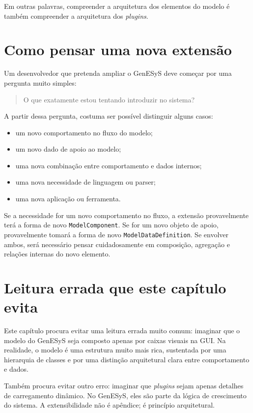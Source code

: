 Em outras palavras, compreender a arquitetura dos elementos do modelo é também compreender a arquitetura dos \textit{plugins}.

\section{Como pensar uma nova extensão}
\label{sec:cap8_como_pensar_nova_extensao}

Um desenvolvedor que pretenda ampliar o GenESyS deve começar por uma pergunta muito simples:
\begin{quote}
    O que exatamente estou tentando introduzir no sistema?
\end{quote}

A partir dessa pergunta, costuma ser possível distinguir alguns casos:

\begin{itemize}
    \item um novo comportamento no fluxo do modelo;
    \item um novo dado de apoio ao modelo;
    \item uma nova combinação entre comportamento e dados internos;
    \item uma nova necessidade de linguagem ou parser;
    \item uma nova aplicação ou ferramenta.
\end{itemize}

Se a necessidade for um novo comportamento no fluxo, a extensão provavelmente terá a forma de novo \texttt{ModelComponent}. Se for um novo objeto de apoio, provavelmente tomará a forma de novo \texttt{ModelDataDefinition}. Se envolver ambos, será necessário pensar cuidadosamente em composição, agregação e relações internas do novo elemento.

\section{Leitura errada que este capítulo evita}
\label{sec:cap8_leitura_errada_evita}

Este capítulo procura evitar uma leitura errada muito comum: imaginar que o modelo do GenESyS seja composto apenas por caixas visuais na GUI. Na realidade, o modelo é uma estrutura muito mais rica, sustentada por uma hierarquia de classes e por uma distinção arquitetural clara entre comportamento e dados.

Também procura evitar outro erro: imaginar que \textit{plugins} sejam apenas detalhes de carregamento dinâmico. No GenESyS, eles são parte da lógica de crescimento do sistema. A extensibilidade não é apêndice; é princípio arquitetural.

